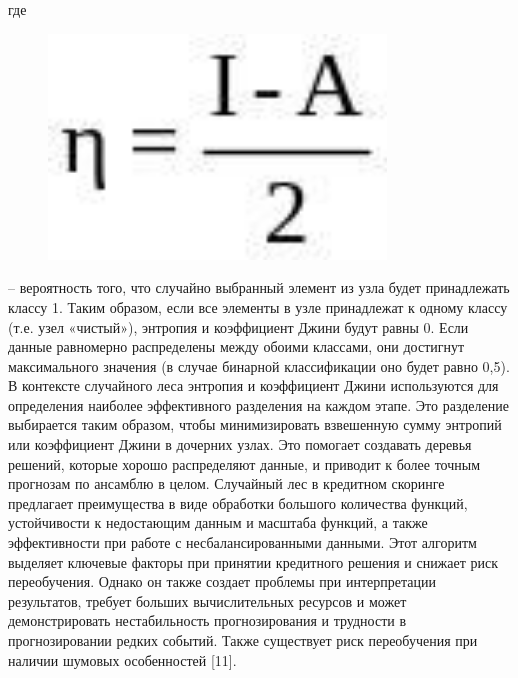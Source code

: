 где\begin{figure}[H]
	\centering
	\includegraphics[width=0.8\textwidth]{assets/33}
	\caption*{}
\end{figure}-- вероятность того, что случайно
выбранный элемент из узла будет принадлежать классу 1. Таким образом,
если все элементы в узле принадлежат к одному классу (т.е. узел
«чистый»), энтропия и коэффициент Джини будут равны 0. Если данные
равномерно распределены между обоими классами, они достигнут
максимального значения (в случае бинарной классификации оно будет равно
0,5). В контексте случайного леса энтропия и коэффициент Джини
используются для определения наиболее эффективного разделения на каждом
этапе. Это разделение выбирается таким образом, чтобы минимизировать
взвешенную сумму энтропий или коэффициент Джини в дочерних узлах. Это
помогает создавать деревья решений, которые хорошо распределяют данные,
и приводит к более точным прогнозам по ансамблю в целом. Случайный лес в
кредитном скоринге предлагает преимущества в виде обработки большого
количества функций, устойчивости к недостающим данным и масштаба
функций, а также эффективности при работе с несбалансированными данными.
Этот алгоритм выделяет ключевые факторы при принятии кредитного решения
и снижает риск переобучения. Однако он также создает проблемы при
интерпретации результатов, требует больших вычислительных ресурсов и
может демонстрировать нестабильность прогнозирования и трудности в
прогнозировании редких событий. Также существует риск переобучения при
наличии шумовых особенностей {[}11{]}.

